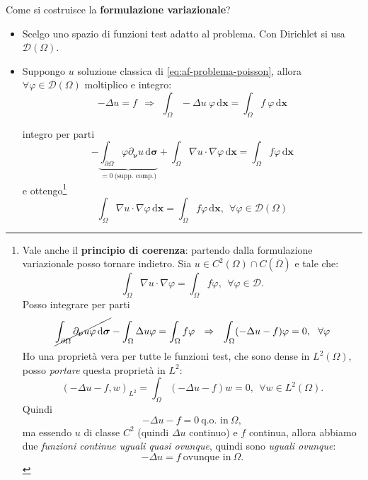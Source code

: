 \documentclass[10pt,a4paper,twoside,openright]{book}
\newcommand{\x}{\mathbf{x}}
\newcommand{\sigg}{\bm{\sigma}}
\newcommand{\nuu}{\bm{\nu}}
\newcommand{\de}{\,\mathrm d}
\newcommand{\dxx}{\de \x}
\newcommand{\dsig}{\de \sigg}
\begin{document}
Come si costruisce la \textbf{formulazione variazionale}?
\begin{itemize}
	\item Scelgo uno spazio di funzioni test adatto al problema. Con Dirichlet si usa $\displaystyle \mathcal{D}(\Omega)$.
	\item Suppongo $u$ soluzione classica di \eqref{eq:af-problema-poisson}, allora $\displaystyle \forall \varphi \in \mathcal{D}(\Omega)$ moltiplico e integro:
	      \begin{equation*}
	      	-\Delta u=f\ \ \Rightarrow \ \ \int _{\Omega } -\Delta u\ \varphi \dxx =\int _{\Omega } f\ \varphi \dxx
	      \end{equation*}
	      
	      integro per parti
	      \begin{equation*}
	      	-\underbrace{\int _{\partial \Omega } \varphi \partial _{\bm{\nu }} u\dsig }_{=0\ \text{(supp. comp.)}} +\int _{\Omega } \nabla u\cdotp \nabla \varphi \dxx =\int _{\Omega } f\varphi \dxx
	      \end{equation*}
	      \newpage
	      e ottengo\footnote{Vale anche il \textbf{principio di coerenza}: partendo dalla formulazione variazionale posso tornare indietro. Sia $\displaystyle u\in C^{2}(\Omega) \cap C(\overline{\Omega })$ e tale che:
	      	\begin{equation*}
	      		\int _{\Omega } \nabla u\cdotp \nabla \varphi =\int _{\Omega } f\varphi ,\ \ \forall \varphi \in \mathcal{D} .
	      	\end{equation*}
	      	Posso integrare per parti
	      	\begin{equation*}
	      		\cancel{\int _{\partial \Omega } \partial _{\nuu} u\varphi \dsig } -\int _{\Omega } \Delta u\varphi =\int _{\Omega } f\varphi \ \ \Rightarrow \ \ \int _{\Omega }(-\Delta u-f) \varphi =0,\ \ \forall \varphi 
	      	\end{equation*}
	      	Ho una proprietà vera per tutte le funzioni test, che sono dense in $\displaystyle L^{2}(\Omega)$, posso \textit{portare} questa proprietà in $\displaystyle L^{2}$:
	      	\begin{equation*}
	      		(-\Delta u-f,w)_{L^{2}} =\int _{\Omega }(-\Delta u-f) w=0,\ \ \forall w\in L^{2}(\Omega) .
	      	\end{equation*}
	      	Quindi 
	      	\begin{equation*}
	      		-\Delta u-f=0\ \text{q.o. in} \ \Omega ,
	      	\end{equation*}
	      	ma essendo $u$ di classe $\displaystyle C^{2}$ (quindi $\displaystyle \Delta u$ continuo) e $f$ continua, allora abbiamo due \textit{funzioni continue uguali quasi ovunque}, quindi sono \textit{uguali ovunque}:
	      	\begin{equation*}
	      		-\Delta u=f\ \text{ovunque in} \ \Omega .
	      	\end{equation*}}
	      \begin{equation}
	      	\boxed{\int _{\Omega } \nabla u\cdotp \nabla \varphi \dxx =\int _{\Omega } f\varphi \dxx ,\ \ \forall \varphi \in \mathcal{D}(\Omega)}
	      \end{equation}
\end{itemize}
\end{document}
